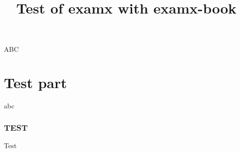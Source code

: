 \documentclass{examx}
\title{Test of examx with examx-book}
\begin{document}
    \maketitle
    
    ABC
    
    
    \part{Test part}
    
    abc
    \section{TEST}
    Test
\end{document}
